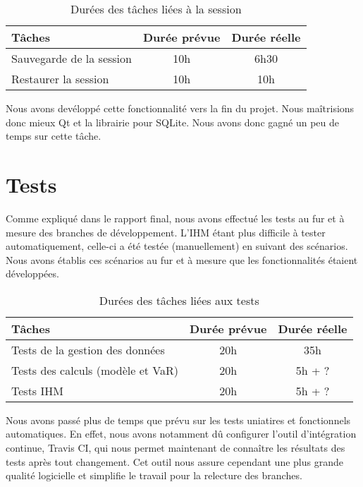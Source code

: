 \documentclass[a4paper]{report}
\begin{document}
\begin{table}[H]
\centering
  \begin{tabularx}{0.8\textwidth}{| X | c | c |}
    \hline
	Tâches & Durée prévue & Durée réelle \\
    \hline
    Sauvegarde de la session &  10h & 6h30\\
    Restaurer la session &  10h & 10h\\
    \hline
  \end{tabularx}
  \caption{Durées des tâches liées à la session}
\end{table}

Nous avons devéloppé cette fonctionnalité vers la fin du projet.
Nous maîtrisions donc mieux Qt et la librairie pour SQLite.
Nous avons donc gagné un peu de temps sur cette tâche.


\chapter{Tests}

Comme expliqué dans le rapport final, nous avons effectué les tests au fur et à mesure des branches de développement.
L'IHM étant plus difficile à tester automatiquement, celle-ci a été testée (manuellement) en suivant des scénarios.
Nous avons établis ces scénarios au fur et à mesure que les fonctionnalités étaient développées.

\begin{table}[H]
\centering
  \begin{tabularx}{0.8\textwidth}{| X | c | c |}
    \hline
	Tâches & Durée prévue & Durée réelle \\
    \hline
    Tests de la gestion des données & 20h & 35h\\
    Tests des calculs (modèle et VaR) & 20h & 5h + ?\\
    Tests IHM & 20h & 5h + ?\\
    \hline
  \end{tabularx}
  \caption{Durées des tâches liées aux tests}
\end{table}

Nous avons passé plus de temps que prévu sur les tests uniatires et fonctionnels automatiques.
En effet, nous avons notamment dû configurer l'outil d'intégration continue, Travis CI, qui nous permet maintenant de connaître les résultats des tests après tout changement.
Cet outil nous assure cependant une plus grande qualité logicielle et simplifie le travail pour la relecture des branches.
\end{document}
